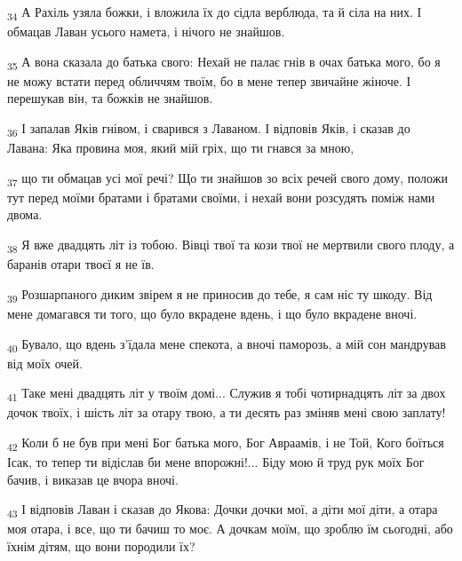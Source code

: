 \begin{tcolorbox}
\textsubscript{34} А Рахіль узяла божки, і вложила їх до сідла верблюда, та й сіла на них. І обмацав Лаван усього намета, і нічого не знайшов.
\end{tcolorbox}
\begin{tcolorbox}
\textsubscript{35} А вона сказала до батька свого: Нехай не палає гнів в очах батька мого, бо я не можу встати перед обличчям твоїм, бо в мене тепер звичайне жіноче. І перешукав він, та божків не знайшов.
\end{tcolorbox}
\begin{tcolorbox}
\textsubscript{36} І запалав Яків гнівом, і сварився з Лаваном. І відповів Яків, і сказав до Лавана: Яка провина моя, який мій гріх, що ти гнався за мною,
\end{tcolorbox}
\begin{tcolorbox}
\textsubscript{37} що ти обмацав усі мої речі? Що ти знайшов зо всіх речей свого дому, положи тут перед моїми братами і братами своїми, і нехай вони розсудять поміж нами двома.
\end{tcolorbox}
\begin{tcolorbox}
\textsubscript{38} Я вже двадцять літ із тобою. Вівці твої та кози твої не мертвили свого плоду, а баранів отари твоєї я не їв.
\end{tcolorbox}
\begin{tcolorbox}
\textsubscript{39} Розшарпаного диким звірем я не приносив до тебе, я сам ніс ту шкоду. Від мене домагався ти того, що було вкрадене вдень, і що було вкрадене вночі.
\end{tcolorbox}
\begin{tcolorbox}
\textsubscript{40} Бувало, що вдень з'їдала мене спекота, а вночі паморозь, а мій сон мандрував від моїх очей.
\end{tcolorbox}
\begin{tcolorbox}
\textsubscript{41} Таке мені двадцять літ у твоїм домі... Служив я тобі чотирнадцять літ за двох дочок твоїх, і шість літ за отару твою, а ти десять раз зміняв мені свою заплату!
\end{tcolorbox}
\begin{tcolorbox}
\textsubscript{42} Коли б не був при мені Бог батька мого, Бог Авраамів, і не Той, Кого боїться Ісак, то тепер ти відіслав би мене впорожні!... Біду мою й труд рук моїх Бог бачив, і виказав це вчора вночі.
\end{tcolorbox}
\begin{tcolorbox}
\textsubscript{43} І відповів Лаван і сказав до Якова: Дочки дочки мої, а діти мої діти, а отара моя отара, і все, що ти бачиш то моє. А дочкам моїм, що зроблю їм сьогодні, або їхнім дітям, що вони породили їх?
\end{tcolorbox}
